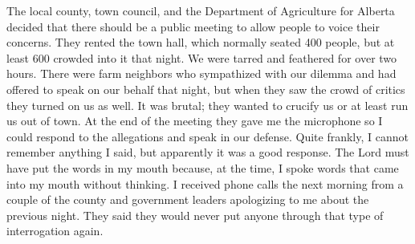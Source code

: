 \documentclass[twoside, 12pt]{book}
\begin{document}
The local county, town council, and the Department of Agriculture for Alberta decided that there should be a public meeting to allow people to voice their concerns. They rented the town hall, which normally seated 400 people, but at least 600 crowded into it that night. We were tarred and feathered for over two hours. There were farm neighbors who sympathized with our dilemma and had offered to speak on our behalf that night, but when they saw the crowd of critics they turned on us as well. It was brutal; they wanted to crucify us or at least run us out of town. At the end of the meeting they gave me the microphone so I could respond to the allegations and speak in our defense. Quite frankly, I cannot remember anything I said, but apparently it was a good response. The Lord must have put the words in my mouth because, at the time, I spoke words that came into my mouth without thinking. I received phone calls the next morning from a couple of the county and government leaders apologizing to me about the previous night. They said they would never put anyone through that type of interrogation again. 
\end{document}
